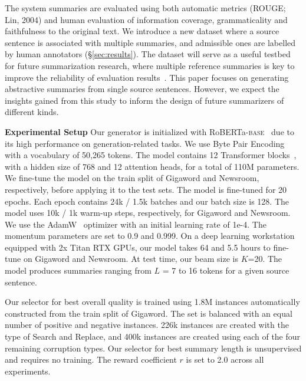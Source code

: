 \documentclass[11pt]{article}
\begin{document}
The system summaries are evaluated using both automatic metrics (ROUGE; Lin, 2004)\nocite{lin-2004-rouge} and human evaluation of information coverage, grammaticality and faithfulness to the original text.
We introduce a new dataset where a source sentence is associated with multiple summaries, and admissible ones are labelled by human annotators (\S\ref{sec:results}).
The dataset will serve as a useful testbed for future summarization research, where multiple reference summaries is key to improve the reliability of evaluation results~\cite{louis-nenkova-2013-automatically}.
This paper focuses on generating abstractive summaries from single source sentences. 
However, we expect the insights gained from this study to inform the design of future summarizers of different kinds.


\vspace{0.08in}
\noindent\textbf{Experimental Setup}\quad
Our generator is initialized with RoBERTa-\textsc{base}~\cite{liu2019roberta} due to its high performance on generation-related tasks.
We use Byte Pair Encoding~\cite{sennrich-etal-2016-neural} with a vocabulary of 50,265 tokens.
The model contains 12 Transformer blocks~\cite{NIPS2017_7181}, with a hidden size of 768 and 12 attention heads, for a total of 110M parameters.
We fine-tune the model on the train split of Gigaword and Newsroom, respectively, before applying it to the test sets. 
The model is fine-tuned for 20 epochs. 
Each epoch contains 24k / 1.5k batches and our batch size is 128. 
The model uses 10k / 1k warm-up steps, respectively, for Gigaword and Newsroom.
We use the AdamW~\cite{loshchilov2017decoupled} optimizer with an initial learning rate of 1e-4.
The momentum parameters are set to 0.9 and 0.999.
On a deep learning workstation equipped with 2x Titan RTX GPUs, our model takes 64 and 5.5 hours to fine-tune on Gigaword and Newsroom.
At test time, our beam size is $K$=20.
The model produces summaries ranging from $L$ = 7 to 16 tokens for a given source sentence.


Our selector for best overall quality is trained using 1.8M instances automatically constructed from the train split of Gigaword.
The set is balanced with an equal number of positive and negative instances.
226k instances are created with the type of Search and Replace, and 400k instances are created using each of the four remaining corruption types.
Our selector for best summary length is unsupervised and requires no training. 
The reward coefficient $r$ is set to 2.0 across all experiments.
\end{document}
